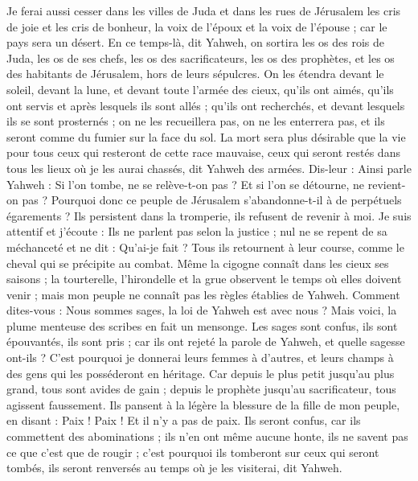 \begin{multicols}{2}
Je ferai aussi cesser dans les villes de Juda et dans les rues de Jérusalem  les cris de joie et les cris de bonheur, la voix de l’époux et la voix de l’épouse ; car le pays sera un désert.
\VerseOne{}En ce temps-là, dit Yahweh, on sortira les os des rois de Juda, les os de ses chefs, les os des sacrificateurs, les os des prophètes, et les os des habitants de Jérusalem, hors de leurs sépulcres.
On les étendra devant le soleil, devant la lune, et devant toute l'armée des cieux, qu'ils ont aimés, qu'ils ont servis et après lesquels ils sont allés ; qu'ils ont recherchés, et devant lesquels ils se sont prosternés ; on ne les recueillera pas, on ne les enterrera pas, et ils seront comme du fumier sur la face du sol.
La mort sera plus désirable que la vie pour tous ceux qui resteront de cette race mauvaise, ceux qui seront restés dans tous les lieux où je les aurai chassés, dit Yahweh des armées.
Dis-leur : Ainsi parle Yahweh : Si l’on tombe, ne se relève-t-on pas ? Et si l’on se détourne, ne revient-on pas ?
Pourquoi donc ce peuple de Jérusalem s’abandonne-t-il à de perpétuels égarements ? Ils persistent dans la tromperie, ils refusent de revenir à moi.
Je suis attentif et j’écoute : Ils ne parlent pas selon la justice ; nul ne se repent de sa méchanceté et ne dit : Qu'ai-je fait ? Tous ils retournent à leur course, comme le cheval qui se précipite au combat.
Même la cigogne connaît dans les cieux ses saisons ; la tourterelle, l'hirondelle et la grue observent le temps où elles doivent venir ; mais mon peuple ne connaît pas les règles établies de Yahweh.
Comment dites-vous : Nous sommes sages, la loi de Yahweh est avec nous ? Mais voici, la plume menteuse des scribes en fait un mensonge.
Les sages sont confus, ils sont épouvantés, ils sont pris ; car ils ont rejeté la parole de Yahweh, et quelle sagesse ont-ils ?
C'est pourquoi je donnerai leurs femmes à d'autres, et leurs champs à des gens qui les posséderont en héritage. Car depuis le plus petit jusqu’au plus grand, tous sont avides de gain ; depuis le prophète jusqu’au sacrificateur, tous agissent faussement.
Ils pansent à la légère la blessure de la fille de mon peuple, en disant : Paix ! Paix ! Et il n'y a pas de paix.
Ils seront confus, car ils commettent des abominations ; ils n'en ont même aucune honte, ils ne savent pas ce que c'est que de rougir ; c'est pourquoi ils tomberont sur ceux qui seront tombés, ils seront renversés au temps où je les visiterai, dit Yahweh.

\end{multicols}
